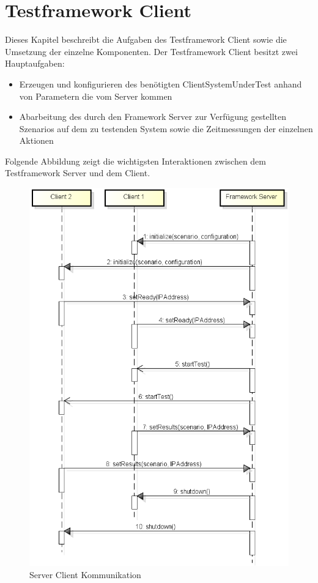 \section{Testframework Client}
\label{sec:test-FW Client}
Dieses Kapi\-tel beschreibt die Aufgaben des Testframework Client sowie die Umsetzung der einzelne Komponenten. Der Testframework Client besitzt zwei Hauptaufgaben:
\begin{itemize}
\item Erzeugen und konfigurieren des benötigten ClientSystemUnderTest anhand von Parametern die vom Server kommen
\item Abarbeitung des durch den Framework Server zur Verfügung gestellten Szenarios auf dem zu testenden System sowie die Zeitmessungen der einzelnen Aktionen
\end{itemize}
Folgende Abbildung zeigt die wichtigsten Interaktionen zwischen dem Testframework Server und dem Client.
\begin{figure}[H]
\begin{center}
\includegraphics[scale=0.5]{image_testFramework/Server_Client_Communication.png}
\end{center}
\caption{Server Client Kommunikation}
\end{figure}

